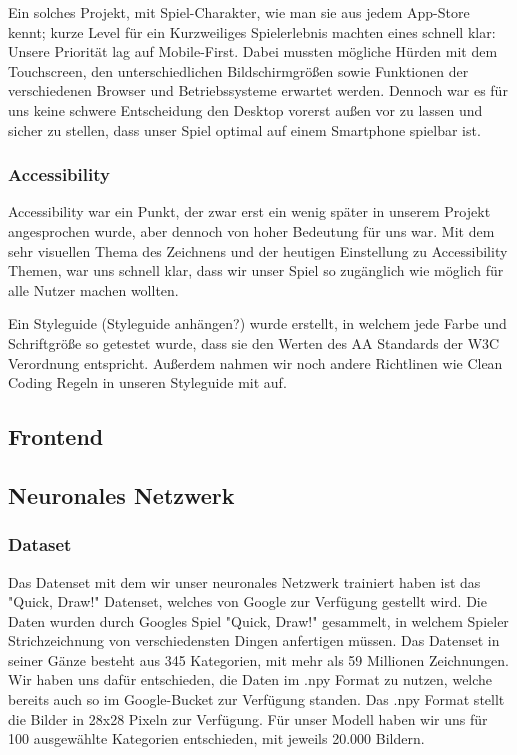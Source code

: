 \documentclass[11pt]{article}
\begin{document}
Ein solches Projekt, mit Spiel-Charakter, wie man sie aus jedem App-Store kennt; kurze Level für ein Kurzweiliges Spielerlebnis machten eines schnell klar: Unsere Priorität lag auf Mobile-First.
Dabei mussten mögliche Hürden mit dem Touchscreen, den unterschiedlichen Bildschirmgrößen sowie Funktionen der verschiedenen Browser und Betriebssysteme erwartet werden. Dennoch war es für uns keine schwere Entscheidung den Desktop vorerst außen vor zu lassen und sicher zu stellen, dass unser Spiel optimal auf einem Smartphone spielbar ist.

\subsubsection{Accessibility}

Accessibility war ein Punkt, der zwar erst ein wenig später in unserem Projekt angesprochen wurde, aber dennoch von hoher Bedeutung für uns war. Mit dem sehr visuellen Thema des Zeichnens und der heutigen Einstellung zu Accessibility Themen, war uns schnell klar, dass wir unser Spiel so zugänglich wie möglich für alle Nutzer machen wollten.

Ein Styleguide (Styleguide anhängen?) wurde erstellt, in welchem jede Farbe und Schriftgröße so getestet wurde, dass sie den Werten des AA Standards der W3C Verordnung entspricht. Außerdem nahmen wir noch andere Richtlinen wie Clean Coding Regeln in unseren Styleguide mit auf.

\subsection{Frontend}
\subsection{Neuronales Netzwerk}
\subsubsection{Dataset}
Das Datenset mit dem wir unser neuronales Netzwerk trainiert haben ist das "Quick, Draw!" Datenset, welches von Google zur Verfügung gestellt wird. Die Daten wurden durch Googles Spiel "Quick, Draw!" gesammelt, in welchem Spieler Strichzeichnung von verschiedensten Dingen anfertigen müssen. Das Datenset in seiner Gänze besteht aus 345 Kategorien, mit mehr als 59 Millionen Zeichnungen. 
Wir haben uns dafür entschieden, die Daten im .npy Format zu nutzen, welche bereits auch so im Google-Bucket zur Verfügung standen. Das .npy Format stellt die Bilder in 28x28 Pixeln zur Verfügung. 
Für unser Modell haben wir uns für 100 ausgewählte Kategorien entschieden, mit jeweils 20.000 Bildern.
\end{document}
